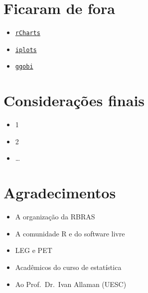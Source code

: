 \section{Ficaram de fora}

\begin{frame}

  \begin{itemize}
  \item \href{http://ramnathv.github.io/rCharts/}{\texttt{rCharts}}
  \item
    \href{http://cran.r-project.org/web/packages/iplots/index.html}{\texttt{iplots}}
  \item
    \href{http://cran.r-project.org/web/packages/rggobi/index.html}{\texttt{ggobi}}
  \end{itemize}

\end{frame}

\section{Considerações finais}

\begin{frame}

  \begin{itemize}
  \item 1
  \item 2
  \item \ldots{}
  \end{itemize}

\end{frame}

\section{Agradecimentos}

\begin{frame}

  \begin{itemize}
  \item A organização da RBRAS
  \item A comunidade R e do software livre
  \item LEG e PET
  \item Acadêmicos do curso de estatística
  \item Ao Prof.~Dr.~Ivan Allaman (UESC)
  \end{itemize}

\end{frame}